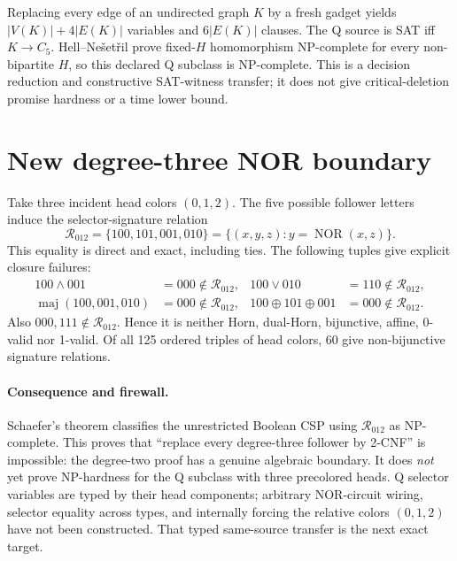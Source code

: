 \documentclass[11pt]{article}
\begin{document}
Replacing every edge of an undirected graph $K$ by a fresh gadget yields $|V(K)|+4|E(K)|$ variables and $6|E(K)|$ clauses.  The Q source is SAT iff $K\to C_5$.  Hell--Ne\v{s}et\v{r}il prove fixed-$H$ homomorphism NP-complete for every non-bipartite $H$, so this declared Q subclass is NP-complete.  This is a decision reduction and constructive SAT-witness transfer; it does not give critical-deletion promise hardness or a time lower bound.

\section{New degree-three NOR boundary}
Take three incident head colors $(0,1,2)$.  The five possible follower letters induce the selector-signature relation
\[
\mathcal R_{012}=\{100,101,001,010\}
=\{(x,y,z):y=\operatorname{NOR}(x,z)\}.
\]
This equality is direct and exact, including ties.  The following tuples give explicit closure failures:
\begin{align*}
100\wedge001&=000\notin\mathcal R_{012},&
100\vee010&=110\notin\mathcal R_{012},\\
\operatorname{maj}(100,001,010)&=000\notin\mathcal R_{012},&
100\oplus101\oplus001&=000\notin\mathcal R_{012}.
\end{align*}
Also $000,111\notin\mathcal R_{012}$.  Hence it is neither Horn, dual-Horn, bijunctive, affine, 0-valid nor 1-valid.  Of all 125 ordered triples of head colors, 60 give non-bijunctive signature relations.

\paragraph{Consequence and firewall.}
Schaefer's theorem classifies the unrestricted Boolean CSP using $\mathcal R_{012}$ as NP-complete.  This proves that ``replace every degree-three follower by 2-CNF'' is impossible: the degree-two proof has a genuine algebraic boundary.  It does \emph{not} yet prove NP-hardness for the Q subclass with three precolored heads.  Q selector variables are typed by their head components; arbitrary NOR-circuit wiring, selector equality across types, and internally forcing the relative colors $(0,1,2)$ have not been constructed.  That typed same-source transfer is the next exact target.
\end{document}

